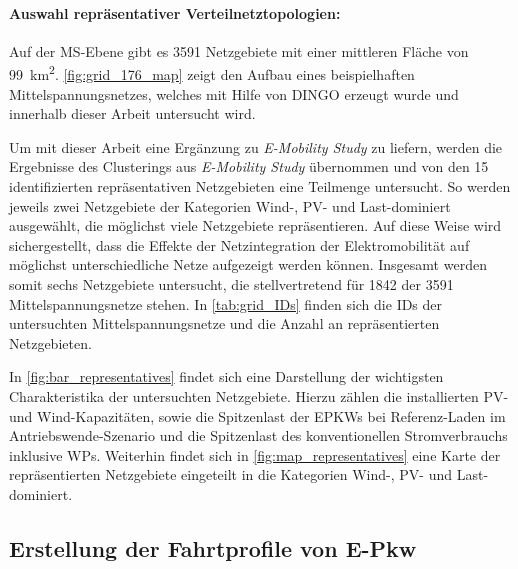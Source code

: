 \paragraph{Auswahl repräsentativer Verteilnetztopologien:}

Auf der \gls{MS}-Ebene gibt es {\color{red} \num{3591}} Netzgebiete mit einer mittleren Fläche von \SI{99}{\km\squared}.
\autoref{fig:grid_176_map} zeigt den Aufbau eines beispielhaften Mittelspannungsnetzes, welches mit Hilfe von \gls{DINGO} erzeugt wurde und innerhalb dieser Arbeit untersucht wird.



Um mit dieser Arbeit eine Ergänzung zu \textit{E-Mobility Study} \cite{Schachler} zu liefern, werden die Ergebnisse des Clusterings aus \textit{E-Mobility Study} \cite{Schachler} übernommen und von den \num{15} identifizierten repräsentativen Netzgebieten eine Teilmenge untersucht.
So werden jeweils zwei Netzgebiete der Kategorien Wind-, \gls{PV}- und Last-dominiert ausgewählt, die möglichst viele Netzgebiete repräsentieren.
Auf diese Weise wird sichergestellt, dass die Effekte der Netzintegration der Elektromobilität auf möglichst unterschiedliche Netze aufgezeigt werden können.
Insgesamt werden somit sechs Netzgebiete untersucht, die stellvertretend für \num{1842} der {\color{red} \num{3591}} Mittelspannungsnetze stehen.
In \autoref{tab:grid_IDs} finden sich die \glspl{ID} der untersuchten Mittelspannungsnetze und die Anzahl an repräsentierten Netzgebieten.



In \autoref{fig:bar_representatives} findet sich eine Darstellung der wichtigsten Charakteristika der untersuchten Netzgebiete.
Hierzu zählen die installierten \gls{PV}- und Wind-Kapazitäten, sowie die Spitzenlast der \glspl{EPKW} bei Referenz-Laden im Antriebswende-Szenario und die Spitzenlast des konventionellen Stromverbrauchs inklusive \glspl{WP}.
Weiterhin findet sich in \autoref{fig:map_representatives} eine Karte der repräsentierten Netzgebiete eingeteilt in die Kategorien Wind-, \gls{PV}- und Last-dominiert.






\subsection{Erstellung der Fahrtprofile von E-Pkw}\label{chap:simbev_theo}

